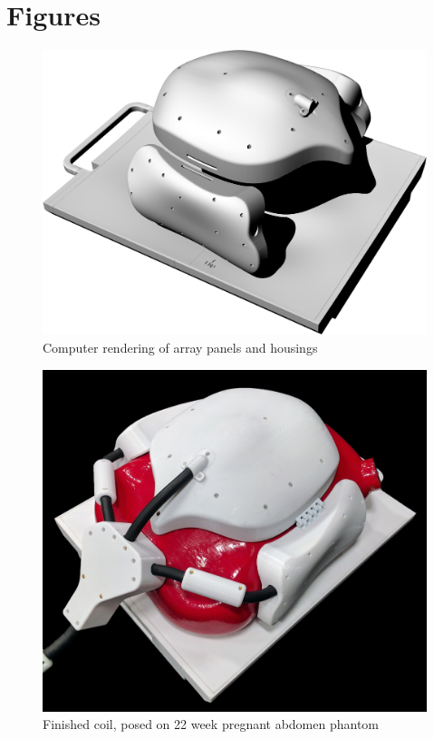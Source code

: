 \chapter{Figures}

\vspace*{-3in}


\begin{figure}
\vspace{2.4in}
\includegraphics[width=6in]{figures/cad_rendering.png}
\caption{Computer rendering of array panels and housings}
\label{fig:cad_rendering}
\end{figure}
\clearpage
\newpage

\begin{figure}
\vspace{2.4in}
\includegraphics[width=6in]{figures/assembled_view.jpg}
\caption{Finished coil, posed on 22 week pregnant abdomen phantom}
\label{fig:assembled_view}
\end{figure}
\clearpage
\newpage

